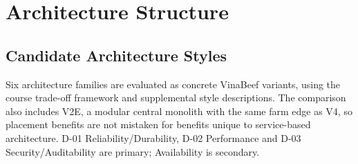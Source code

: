 \section{Architecture Structure}\label{sec:4}

\subsection{Candidate Architecture Styles}\label{sec:4.1}

Six architecture families are evaluated as concrete VinaBeef variants,
using the course trade-off framework and supplemental style
descriptions. The comparison also includes V2E, a modular
central monolith with the same farm edge as V4, so placement benefits
are not mistaken for benefits unique to service-based architecture. D-01
Reliability/Durability, D-02 Performance and D-03 Security/Auditability
are primary; Availability is secondary.


